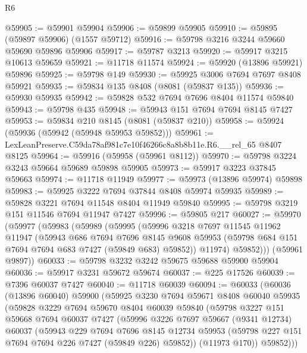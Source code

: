 \begin{lexlean}{R6}
\begin{coremodule}
@59905 := @59901 @59904
@59906 := @59899 @59905
@59910 := @59895 (@59897 @59906) (@1557 @59712)
@59916 := @59798 @3216 @3244 @59660 @59690 @59896 @59906
@59917 := @59787 @3213
@59920 := @59917 @3215 @10613 @59659
@59921 := @11718 @11574
@59924 := @59920 (@13896 @59921) @59896
@59925 := @59798 @149
@59930 := @59925 @3006 @7694 @7697 @8408 @59921
@59935 := @59834 @135 @8408 (@8081 (@59837 @135))
@59936 := @59930 @59935
@59942 := @59828 @532 @7694 @7696 @8404 @11574 @59840
@59943 := @59798 @435
@59948 := @59943 @151 @7694 @7694 @8145 @7427
@59953 := @59834 @210 @8145 (@8081 (@59837 @210))
@59958 := @59924 (@59936 (@59942 (@59948 @59953 @59852)))
@59961 := LexLeanPreserve.C59da78af981c7e10f46266c8a8b8b11e.R6.__rel_65 @8407 @8125
@59964 := @59916 (@59958 (@59961 @8112))
@59970 := @59798 @3224 @3243 @59664 @59689 @59898 @59905
@59973 := @59917 @3223 @37845 @59663
@59974 := @11718 @11949
@59977 := @59973 (@13896 @59974) @59898
@59983 := @59925 @3222 @7694 @37844 @8408 @59974 @59935
@59989 := @59828 @3221 @7694 @11548 @8404 @11949 @59840
@59995 := @59798 @3219 @151 @11546 @7694 @11947 @7427
@59996 := @59805 @217
@60027 := @59970
    (@59977
      (@59983
        (@59989
          (@59995
            (@59996
              @3218
              @7697
              @11545
              @11962
              @11947
              (@59943
                @686
                @7694
                @7696
                @8145
                @9608
                @59953
                (@59798 @684 @151 @7694 @7694 @683 @7427 (@59849 @683) @59852))
              @11974)
            @59852)))
      (@59961 @9897))
@60033 := @59798 @3232 @3242 @59675 @59688 @59900 @59904
@60036 := @59917 @3231 @59672 @59674
@60037 := @225 @17526
@60039 := @7396 @60037 @7427
@60040 := @11718 @60039
@60094 := @60033
    (@60036
      (@13896 @60040)
      @59900
      (@59925
        @3230
        @7694
        @59671
        @8408
        @60040
        @59935
        (@59828
          @3229
          @7694
          @59670
          @8404
          @60039
          @59840
          (@59798
            @3227
            @151
            @59668
            @7694
            @60037
            @7427
            (@59996
              @3226
              @7697
              @59667
              (@9341 @12734)
              @60037
              (@59943
                @229
                @7694
                @7696
                @8145
                @12734
                @59953
                (@59798 @227 @151 @7694 @7694 @226 @7427 (@59849 @226) @59852))
              (@11973 @170))
            @59852)))

\end{coremodule}
\end{lexlean}
